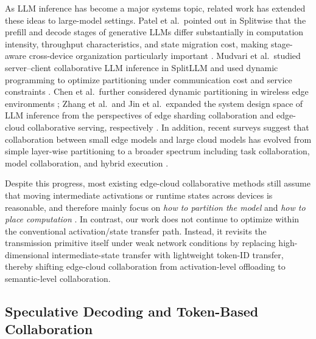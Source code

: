 \documentclass[a4paper,fleqn]{cas-dc}
\begin{document}
As LLM inference has become a major systems topic, related work has extended these ideas to large-model settings. Patel et al.\ pointed out in Splitwise that the prefill and decode stages of generative LLMs differ substantially in computation intensity, throughput characteristics, and state migration cost, making stage-aware cross-device organization particularly important \cite{patel2024splitwise}. Mudvari et al.\ studied server--client collaborative LLM inference in SplitLLM and used dynamic programming to optimize partitioning under communication cost and service constraints \cite{mudvari2024splitllm}. Chen et al.\ further considered dynamic partitioning in wireless edge environments \cite{chen2025adaptivelayersplitting}; Zhang et al.\ and Jin et al.\ expanded the system design space of LLM inference from the perspectives of edge sharding collaboration and edge-cloud collaborative serving, respectively \cite{zhang2025edgeshard,jin2024cecollm}. In addition, recent surveys suggest that collaboration between small edge models and large cloud models has evolved from simple layer-wise partitioning to a broader spectrum including task collaboration, model collaboration, and hybrid execution \cite{li2025edgecloudsurvey,cai2026edge_llm_survey}.

Despite this progress, most existing edge-cloud collaborative methods still assume that moving intermediate activations or runtime states across devices is reasonable, and therefore mainly focus on \emph{how to partition the model} and \emph{how to place computation} \cite{kang2017neurosurgeon,patel2024splitwise,mudvari2024splitllm,chen2025adaptivelayersplitting,zhang2025edgeshard,jin2024cecollm}. In contrast, our work does not continue to optimize within the conventional activation/state transfer path. Instead, it revisits the transmission primitive itself under weak network conditions by replacing high-dimensional intermediate-state transfer with lightweight token-ID transfer, thereby shifting edge-cloud collaboration from activation-level offloading to semantic-level collaboration.

\subsection{Speculative Decoding and Token-Based Collaboration}
\end{document}
